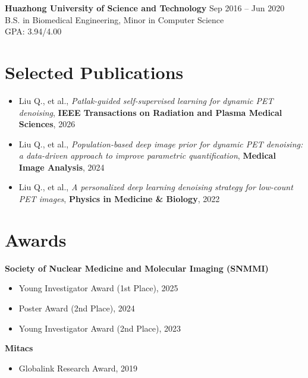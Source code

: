 \textbf{Huazhong University of Science and Technology} \hfill Sep 2016 -- Jun 2020 \\
B.S. in Biomedical Engineering, Minor in Computer Science \\
GPA: 3.94/4.00

\section{Selected Publications}
\begin{itemize}[leftmargin=*]
\item Liu Q., et al., \textit{Patlak-guided self-supervised learning for dynamic PET denoising}, \textbf{IEEE Transactions on Radiation and Plasma Medical Sciences}, 2026
\item Liu Q., et al., \textit{Population-based deep image prior for dynamic PET denoising: a data-driven approach to improve parametric quantification}, \textbf{Medical Image Analysis}, 2024
\item Liu Q., et al., \textit{A personalized deep learning denoising strategy for low-count PET images}, \textbf{Physics in Medicine \& Biology}, 2022
\end{itemize}

\section{Awards}
\textbf{Society of Nuclear Medicine and Molecular Imaging (SNMMI)}
\begin{itemize}[leftmargin=*]
\item Young Investigator Award (1st Place), 2025
\item Poster Award (2nd Place), 2024
\item Young Investigator Award (2nd Place), 2023
\end{itemize}

\textbf{Mitacs}
\begin{itemize}[leftmargin=*]
\item Globalink Research Award, 2019
\end{itemize}